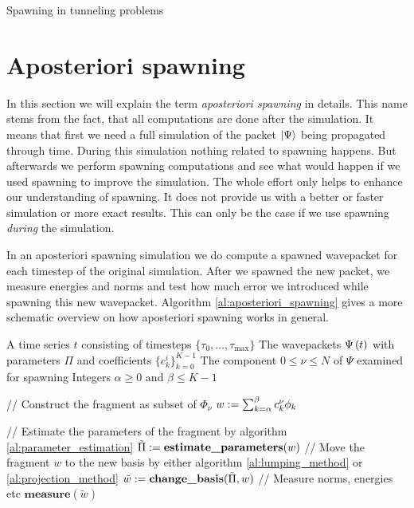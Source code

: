 \begin{chapter}{Spawning in tunneling problems}
\section{Aposteriori spawning}

In this section we will explain the term \emph{aposteriori spawning} in details.
This name stems from the fact, that all computations are done after the simulation.
It means that first we need a full simulation of the packet $\Ket{\Psi}$ being
propagated through time. During this simulation nothing related to spawning
happens. But afterwards we perform spawning computations and see what would happen
if we used spawning to improve the simulation. The whole effort only helps to
enhance our understanding of spawning. It does not provide us with a better
or faster simulation or more exact results. This can only be the case if we
use spawning \emph{during} the simulation.

In an aposteriori spawning simulation we do compute a spawned wavepacket for
each timestep of the original simulation. After we spawned the new packet,
we measure energies and norms and test how much error we introduced while spawning
this new wavepacket. Algorithm \ref{al:aposteriori_spawning} gives a more schematic
overview on how aposteriori spawning works in general.

\begin{algorithm}
\caption{Aposteriori spawning method (in general)}
\label{al:aposteriori_spawning}
\begin{algorithmic}
  \REQUIRE A time series $t$ consisting of timesteps $\{\tau_0, \ldots, \tau_{\text{max}}\}$
  \REQUIRE The wavepackets $\Psi\left( t \right)$ with parameters $\Pi$ and coefficients $\{c^i_k\}_{k=0}^{K-1}$
  \REQUIRE The component $0 \leq \nu \leq N$ of $\Psi$ examined for spawning
  \REQUIRE Integers $\alpha \geq 0$ and $\beta \leq K-1$

    \STATE // Construct the fragment as subset of $\Phi_\nu$
    \STATE $w := \sum_{k=\alpha}^{\beta} c_k^\nu \phi_k$

    \STATE // Estimate the parameters of the fragment by algorithm \ref{al:parameter_estimation}
    \STATE $\tilde{\Pi} := \textbf{estimate\_parameters}(w)$
    \STATE // Move the fragment $w$ to the new basis by either algorithm \ref{al:lumping_method} or \ref{al:projection_method}
    \STATE $\tilde{w} := \textbf{change\_basis}(\tilde{\Pi}, w)$
    \STATE // Measure norms, energies etc
    \STATE $\textbf{measure}(\tilde{w})$
  \ENDFOR
\end{algorithmic}
\end{algorithm}


\end{chapter}
